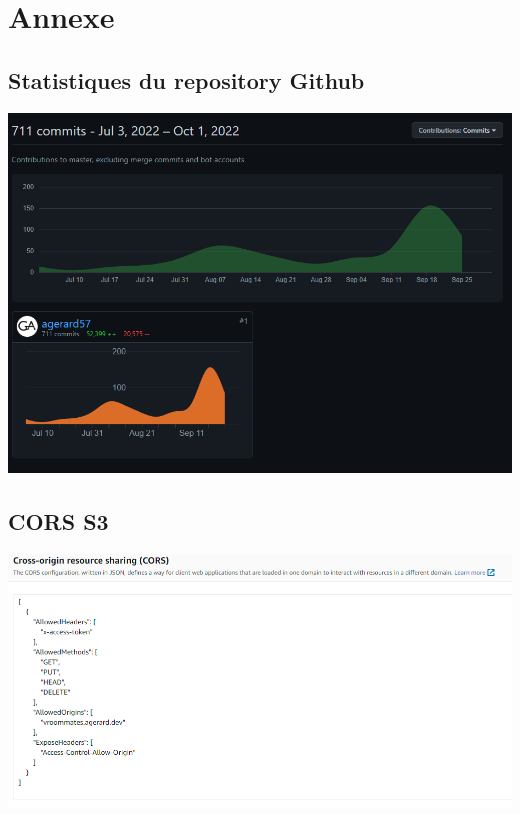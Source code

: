 \appendix
\chapter*{Annexe}
\renewcommand{\thesection}{A.\arabic{section}}


\begin{landscape}
\section{Statistiques du repository Github}
\label{Statistiques du repository Github}
\begin{center}
\includegraphics[scale=0.8]{medias/commits.png}
\end{center}
\end{landscape}

\begin{landscape}
\section{CORS S3}
\label{CORS S3}
\begin{center}
\includegraphics[scale=0.6]{medias/s3Cors.png}
\end{center}
\end{landscape}

